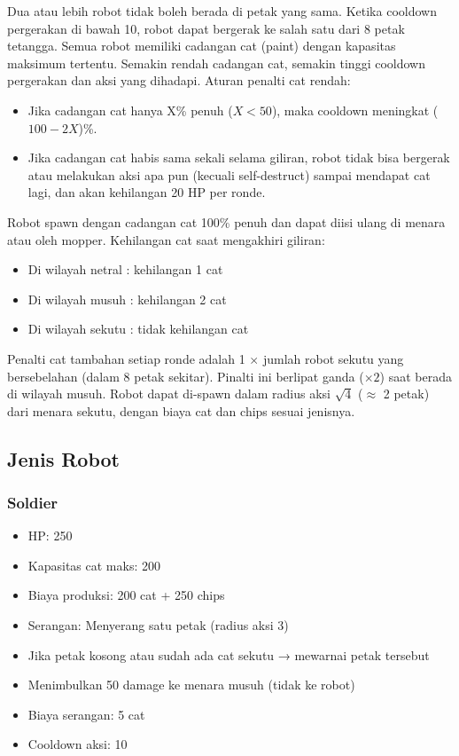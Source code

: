 Dua atau lebih robot tidak boleh berada di petak yang sama. Ketika cooldown pergerakan di bawah 10, robot dapat bergerak ke salah satu dari 8 petak tetangga. Semua robot memiliki cadangan cat (paint) dengan kapasitas maksimum tertentu. Semakin rendah cadangan cat, semakin tinggi cooldown pergerakan dan aksi yang dihadapi.
Aturan penalti cat rendah:
\begin{itemize}
    \item Jika cadangan cat hanya X\% penuh ($X < 50$), maka cooldown meningkat ($100 - 2X$)\%.
    \item Jika cadangan cat habis sama sekali selama giliran, robot tidak bisa bergerak atau melakukan aksi apa pun (kecuali self-destruct) sampai mendapat cat lagi, dan akan kehilangan 20 HP per ronde.
\end{itemize}

Robot spawn dengan cadangan cat 100\% penuh dan dapat diisi ulang di menara atau oleh mopper. Kehilangan cat saat mengakhiri giliran:
\begin{itemize}
    \item Di wilayah netral : kehilangan 1 cat
    \item Di wilayah musuh : kehilangan 2 cat
    \item Di wilayah sekutu : tidak kehilangan cat
\end{itemize}

Penalti cat tambahan setiap ronde adalah 1 $\times$ jumlah robot sekutu yang bersebelahan (dalam 8 petak sekitar). Pinalti ini berlipat ganda ($\times 2$) saat berada di wilayah musuh. Robot dapat di-spawn dalam radius aksi $\sqrt{4}$ ($\approx$ 2 petak) dari menara sekutu, dengan biaya cat dan chips sesuai jenisnya.

\subsection{Jenis Robot}
\subsubsection{Soldier}
\begin{itemize}
    \item HP: 250
    \item Kapasitas cat maks: 200
    \item Biaya produksi: 200 cat + 250 chips
    \item Serangan: Menyerang satu petak (radius aksi 3)
    \item Jika petak kosong atau sudah ada cat sekutu → mewarnai petak tersebut
    \item Menimbulkan 50 damage ke menara musuh (tidak ke robot)
    \item Biaya serangan: 5 cat
    \item Cooldown aksi: 10
\end{itemize}

